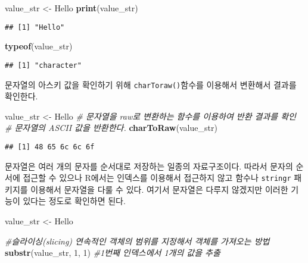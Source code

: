 \documentclass[
]{article}
\newenvironment{Shaded}{\begin{snugshade}}{\end{snugshade}}
\newcommand{\CommentTok}[1]{\textcolor[rgb]{0.56,0.35,0.01}{\textit{#1}}}
\newcommand{\DecValTok}[1]{\textcolor[rgb]{0.00,0.00,0.81}{#1}}
\newcommand{\FunctionTok}[1]{\textcolor[rgb]{0.13,0.29,0.53}{\textbf{#1}}}
\newcommand{\NormalTok}[1]{#1}
\newcommand{\OtherTok}[1]{\textcolor[rgb]{0.56,0.35,0.01}{#1}}
\newcommand{\StringTok}[1]{\textcolor[rgb]{0.31,0.60,0.02}{#1}}
\begin{document}
\begin{Shaded}
\begin{Highlighting}[]
\NormalTok{value\_str }\OtherTok{\textless{}{-}} \StringTok{\textquotesingle{}Hello\textquotesingle{}}
\FunctionTok{print}\NormalTok{(value\_str)}
\end{Highlighting}
\end{Shaded}

\begin{verbatim}
## [1] "Hello"
\end{verbatim}

\begin{Shaded}
\begin{Highlighting}[]
\FunctionTok{typeof}\NormalTok{(value\_str)}
\end{Highlighting}
\end{Shaded}

\begin{verbatim}
## [1] "character"
\end{verbatim}

문자열의 아스키 값을 확인하기 위해 \texttt{charToraw()}함수를 이용해서
변환해서 결과를 확인한다.

\begin{Shaded}
\begin{Highlighting}[]
\NormalTok{value\_str }\OtherTok{\textless{}{-}} \StringTok{\textquotesingle{}Hello\textquotesingle{}}
\CommentTok{\# 문자열을 raw로 변환하는 함수를 이용하여 반환 결과를 확인}
\CommentTok{\# 문자열의 ASCII 값을 반환한다. }
\FunctionTok{charToRaw}\NormalTok{(value\_str) }
\end{Highlighting}
\end{Shaded}

\begin{verbatim}
## [1] 48 65 6c 6c 6f
\end{verbatim}

문자열은 여러 개의 문자를 순서대로 저장하는 일종의 자료구조이다. 따라서
문자의 순서에 접근할 수 있으나 R에서는 인덱스를 이용해서 접근하지 않고
함수나 \texttt{stringr} 패키지를 이용해서 문자열을 다룰 수 있다. 여기서
문자열은 다루지 않겠지만 이러한 기능이 있다는 정도로 확인하면 된다.

\begin{Shaded}
\begin{Highlighting}[]
\NormalTok{value\_str }\OtherTok{\textless{}{-}} \StringTok{\textquotesingle{}Hello\textquotesingle{}}

\CommentTok{\#슬라이싱(slicing) 연속적인 객체의 범위를 지정해서 객체를 가져오는 방법}
\FunctionTok{substr}\NormalTok{(value\_str, }\DecValTok{1}\NormalTok{, }\DecValTok{1}\NormalTok{) }\CommentTok{\#1번째 인덱스에서 1개의 값을 추출}
\end{Highlighting}
\end{Shaded}
\end{document}
